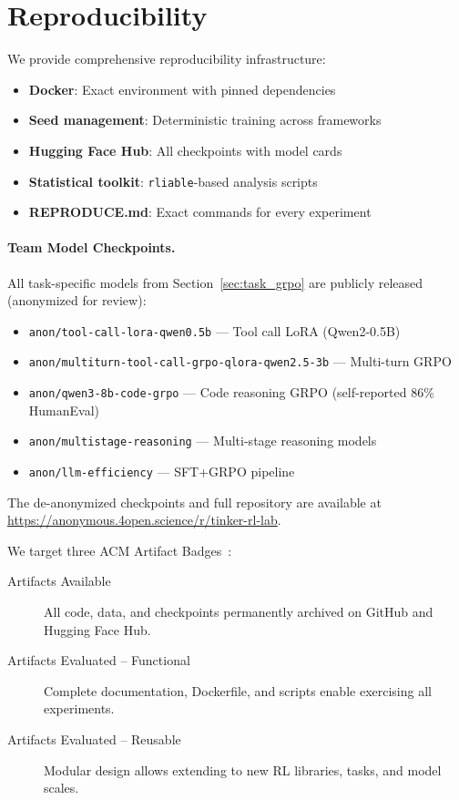 \documentclass[manuscript,review,anonymous]{acmart}
\begin{document}
\section{Reproducibility}
\label{sec:reproducibility}


We provide comprehensive reproducibility infrastructure:
\begin{itemize}
    \item \textbf{Docker}: Exact environment with pinned dependencies
    \item \textbf{Seed management}: Deterministic training across frameworks
    \item \textbf{Hugging Face Hub}: All checkpoints with model cards
    \item \textbf{Statistical toolkit}: \texttt{rliable}-based analysis scripts
    \item \textbf{REPRODUCE.md}: Exact commands for every experiment
\end{itemize}

\paragraph{Team Model Checkpoints.}
All task-specific models from Section~\ref{sec:task_grpo} are publicly released
(anonymized for review):
\begin{itemize}
    \item \texttt{anon/tool-call-lora-qwen0.5b} --- Tool call LoRA (Qwen2-0.5B)
    \item \texttt{anon/multiturn-tool-call-grpo-qlora-qwen2.5-3b} --- Multi-turn GRPO
    \item \texttt{anon/qwen3-8b-code-grpo} --- Code reasoning GRPO (self-reported 86\% HumanEval)
    \item \texttt{anon/multistage-reasoning} --- Multi-stage reasoning models
    \item \texttt{anon/llm-efficiency} --- SFT+GRPO pipeline
\end{itemize}
The de-anonymized checkpoints and full repository are available at
\url{https://anonymous.4open.science/r/tinker-rl-lab}.

We target three ACM Artifact Badges~\cite{acm2020badges}:
\begin{description}
    \item[Artifacts Available] All code, data, and checkpoints permanently
    archived on GitHub and Hugging Face Hub.
    \item[Artifacts Evaluated -- Functional] Complete documentation,
    Dockerfile, and scripts enable exercising all experiments.
    \item[Artifacts Evaluated -- Reusable] Modular design allows extending
    to new RL libraries, tasks, and model scales.
\end{description}
\end{document}
